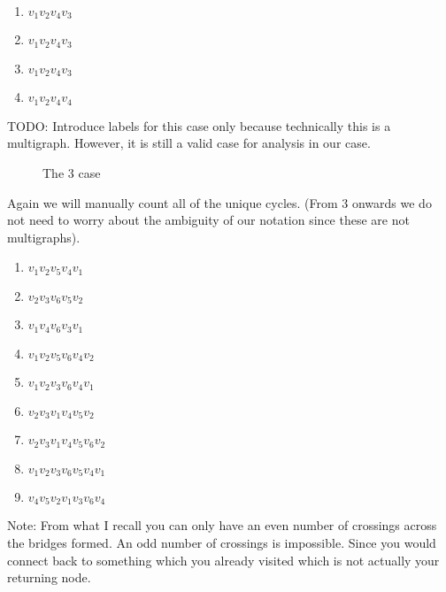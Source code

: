 \documentclass[12pt]{article}
\theoremstyle{plain}
\begin{document}
\begin{enumerate}
\item $v_1 v_2 v_4 v_3$
\item $v_1 v_2 v_4 v_3$
\item $v_1 v_2 v_4 v_3$
\item $v_1 v_2 v_4 v_4$
\end{enumerate}

TODO: Introduce labels for this case only because technically
this is a multigraph. However, it is still a valid case for
analysis in our case.

\begin{figure}[H]
\centering
{}
\caption{The 3 case}
\end{figure}

Again we will manually count all of the unique cycles. (From 3
onwards we do not need to worry about the ambiguity of our
notation since these are not multigraphs).

\begin{enumerate}
\item $v_1 v_2 v_5 v_4 v_1$
\item $v_2 v_3 v_6 v_5 v_2$
\item $v_1 v_4 v_6 v_3 v_1$
\item $v_1 v_2 v_5 v_6 v_4 v_2$
\item $v_1 v_2 v_3 v_6 v_4 v_1$
\item $v_2 v_3 v_1 v_4 v_5 v_2$
\item $v_2 v_3 v_1 v_4 v_5 v_6 v_2$
\item $v_1 v_2 v_3 v_6 v_5 v_4 v_1$
\item $v_4 v_5 v_2 v_1 v_3 v_6 v_4$
\end{enumerate}

Note: From what I recall you can only have an even number of 
crossings across the bridges formed. An odd number of crossings
is impossible. Since you would connect back to something which
you already visited which is not actually your returning
node.
\end{document}
